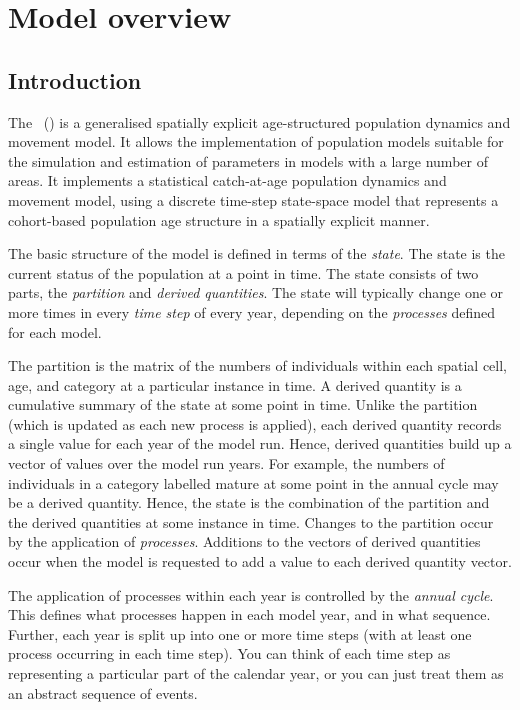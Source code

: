\section{Model overview\label{sec:overview}}

\subsection{Introduction}

The \SPMName\ (\SPM) is a generalised spatially explicit age-structured population dynamics and movement model. It allows the implementation of population models suitable for the simulation and estimation of parameters in models with a large number of areas. It implements a statistical catch-at-age population dynamics and movement model, using a discrete time-step state-space model that represents a cohort-based population age structure in a spatially explicit manner. 

The basic structure  of the model is defined in terms of the \emph{state}. The state is the current status of the population at a point in time. The state consists of two parts, the \emph{partition} and \emph{derived quantities}. The state will typically change one or more times in every \emph{time step} of every year, depending on the \emph{processes} defined for each model. 

The partition is the matrix of the numbers of individuals within each spatial cell, age, and category at a particular instance in  time. A derived quantity is a cumulative summary of the state at some point in time. Unlike the partition (which is updated as each new process is applied), each derived quantity records a single value for each year of the model run. Hence, derived quantities build up a vector of values over the model run years. For example, the numbers of individuals in a category labelled mature at some point in the annual cycle may be a derived quantity. Hence, the state is the combination of the partition and the derived quantities at some instance in time. Changes to the partition occur by the application of \emph{processes}. Additions to the vectors of derived quantities occur when the model is requested to add a value to each derived quantity vector. 

The application of processes within each year is controlled by the \emph{annual cycle}. This defines what processes happen in each model year, and in what sequence. Further, each year is split up into one or more time steps (with at least one process occurring in each time step). You can think of each time step as representing a particular part of the calendar year, or you can just treat them as an abstract sequence of events.


